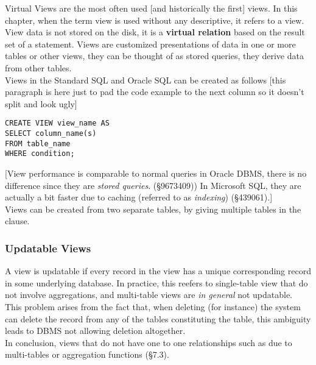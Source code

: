 \documentclass[11pt,a4paper,twocolumn]{book}
\begin{document}
Virtual Views are the most often used [and historically the first] views. In this chapter, when the term view is used without any descriptive, it refers to a view.\\

View data is not stored on the disk, it is a \textbf{virtual relation} based on the result set of a  statement. Views are customized presentations of data in one or more tables or other views, they can be thought of  as stored queries, they derive data from other tables.\\

Views in the Standard SQL and Oracle SQL can be created as follows [this paragraph is here just to pad the code example to the next column so it doesn't split and look ugly]

\begin{lstlisting}
CREATE VIEW view_name AS
SELECT column_name(s)
FROM table_name
WHERE condition;
\end{lstlisting}

[View performance is comparable to normal queries in Oracle DBMS, there is no difference since they are \textit{stored queries}. (\S9673409)) In Microsoft SQL, they are actually a bit faster due to caching (referred to as \textit{indexing}) (\S439061).]\\

Views can be created from two separate tables, by giving multiple tables in the  clause.\\


\subsubsection{Updatable Views}

A view is updatable if every record in the view has a unique corresponding record in some underlying database. In practice, this reefers to single-table view that do not involve aggregations, and multi-table views are \textit{in general} not updatable.\\

This problem arises from the fact that, when deleting (for instance) the system can delete the record from any of the tables constituting the table, this ambiguity leads to DBMS not allowing deletion altogether.\\

In conclusion, views that do not have one to one relationships such as due to multi-tables or aggregation functions (\S7.3).
\end{document}
